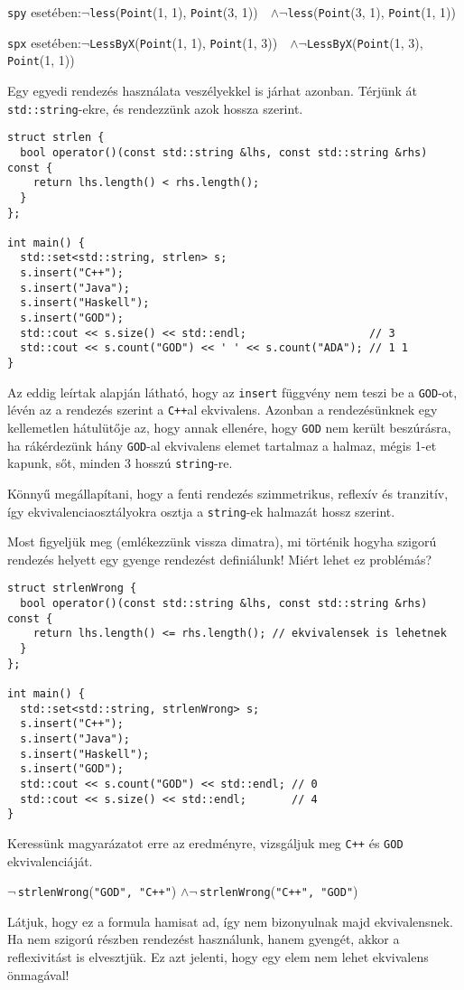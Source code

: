 \documentclass[../cpp_book/cpp_book.tex]{subfiles}
\begin{document}
	\begin{center}	
		\texttt{spy} esetében:\quad  $\neg$\texttt{less}\big(\texttt{Point}(1, 1), \texttt{Point}(3, 1)\big) \,\, $\wedge$\quad $\neg$\texttt{less}\big(\texttt{Point}(3, 1), \texttt{Point}(1, 1)\big)
		
		\texttt{spx} esetében:\quad  $\neg$\texttt{LessByX}\big(\texttt{Point}(1, 1), \texttt{Point}(1, 3)\big) \,\, $\wedge$\quad $\neg$\texttt{LessByX}\big(\texttt{Point}(1, 3), \texttt{Point}(1, 1)\big)
	\end{center}
	Egy egyedi rendezés használata veszélyekkel is járhat azonban. Térjünk át \texttt{std::string}-ekre, és rendezzünk azok hossza szerint.
	\begin{lstlisting}
struct strlen {
  bool operator()(const std::string &lhs, const std::string &rhs) const {
    return lhs.length() < rhs.length();
  }
};

int main() {
  std::set<std::string, strlen> s;
  s.insert("C++");
  s.insert("Java");
  s.insert("Haskell");
  s.insert("GOD");
  std::cout << s.size() << std::endl;                   // 3
  std::cout << s.count("GOD") << ' ' << s.count("ADA"); // 1 1
}
\end{lstlisting}
	Az eddig leírtak alapján látható, hogy az \texttt{insert} függvény nem teszi be a \texttt{GOD}-ot, lévén az a rendezés szerint a \texttt{C++}al ekvivalens. Azonban a rendezésünknek egy kellemetlen hátulütője az, hogy annak ellenére, hogy \texttt{GOD} nem került beszúrásra, ha rákérdezünk hány \texttt{GOD}-al ekvivalens elemet tartalmaz a halmaz, mégis 1-et kapunk, sőt, minden 3 hosszú \texttt{string}-re.
	\begin{note}
		Könnyű megállapítani, hogy a fenti rendezés szimmetrikus, reflexív és tranzitív, így ekvivalenciaosztályokra osztja a \texttt{string}-ek halmazát hossz szerint.
	\end{note}
	Most figyeljük meg (emlékezzünk vissza dimatra), mi történik hogyha szigorú rendezés helyett egy gyenge rendezést definiálunk! Miért lehet ez problémás?
\begin{lstlisting}
struct strlenWrong {
  bool operator()(const std::string &lhs, const std::string &rhs) const {
    return lhs.length() <= rhs.length(); // ekvivalensek is lehetnek
  }
};

int main() {
  std::set<std::string, strlenWrong> s;
  s.insert("C++");
  s.insert("Java");
  s.insert("Haskell");
  s.insert("GOD");
  std::cout << s.count("GOD") << std::endl; // 0
  std::cout << s.size() << std::endl;       // 4
}
\end{lstlisting}
	Keressünk magyarázatot erre az eredményre, vizsgáljuk meg \texttt{C++} és \texttt{GOD} ekvivalenciáját.
	\begin{center}
		$\neg$\,\texttt{strlenWrong}\big(\texttt{"GOD", "C++"}\big)\quad 
		$\wedge$\quad $\neg$\,\texttt{strlenWrong}\big(\texttt{"C++", "GOD"}\big)
	\end{center}
	Látjuk, hogy ez a formula hamisat ad, így nem bizonyulnak majd ekvivalensnek. Ha nem szigorú részben rendezést használunk, hanem gyengét, akkor a reflexivitást is elvesztjük. Ez azt jelenti, hogy egy elem nem lehet ekvivalens önmagával!
	
\end{document}
